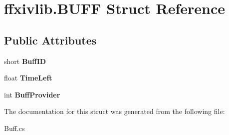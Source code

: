 \hypertarget{structffxivlib_1_1_b_u_f_f}{\section{ffxivlib.\-B\-U\-F\-F Struct Reference}
\label{structffxivlib_1_1_b_u_f_f}
}
\subsection*{Public Attributes}
\begin{DoxyCompactItemize}
\item 
\hypertarget{structffxivlib_1_1_b_u_f_f_a7772020fa8c6aecd4a10b6c4dec94401}{short {\bfseries Buff\-I\-D}}\label{structffxivlib_1_1_b_u_f_f_a7772020fa8c6aecd4a10b6c4dec94401}

\item 
\hypertarget{structffxivlib_1_1_b_u_f_f_ad865dcd932a42af77bfe036d981dd6da}{float {\bfseries Time\-Left}}\label{structffxivlib_1_1_b_u_f_f_ad865dcd932a42af77bfe036d981dd6da}

\item 
\hypertarget{structffxivlib_1_1_b_u_f_f_a3fc10010b492f1a1a85d83fba5081d2b}{int {\bfseries Buff\-Provider}}\label{structffxivlib_1_1_b_u_f_f_a3fc10010b492f1a1a85d83fba5081d2b}

\end{DoxyCompactItemize}


The documentation for this struct was generated from the following file\-:\begin{DoxyCompactItemize}
\item 
Buff.\-cs\end{DoxyCompactItemize}
